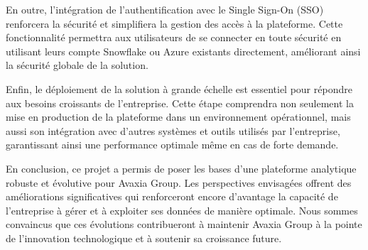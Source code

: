   \par En outre, l'intégration de l'authentification avec le Single Sign-On (SSO) renforcera la sécurité et simplifiera la gestion des accès à la plateforme.
   Cette fonctionnalité permettra aux utilisateurs de se connecter en toute sécurité en utilisant leurs compte Snowflake ou Azure existants directement, améliorant 
   ainsi la sécurité globale de la solution.

 \par Enfin, le déploiement de la solution à grande échelle est essentiel pour répondre aux besoins croissants de l'entreprise. Cette étape comprendra non seulement 
 la mise en production de la plateforme dans un environnement opérationnel, mais aussi son intégration avec d'autres systèmes et outils utilisés par l'entreprise, 
 garantissant ainsi une performance optimale même en cas de forte demande.

 \par En conclusion, ce projet a permis de poser les bases d'une plateforme analytique robuste et évolutive pour Avaxia Group. Les perspectives envisagées offrent 
 des améliorations significatives qui renforceront encore d'avantage la capacité de l'entreprise à gérer et à exploiter ses données de manière optimale.
  Nous sommes convaincus que ces évolutions contribueront à maintenir Avaxia Group à la pointe de l'innovation technologique et à soutenir sa croissance future.
